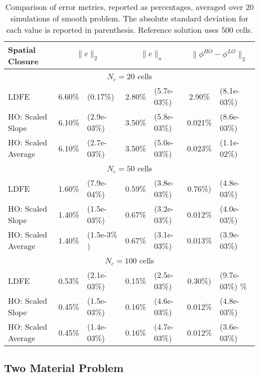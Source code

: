 \begin{table}[H]
    \caption{\label{tab:smooth} Comparison of error metrics, reported as percentages, averaged over 20 simulations of smooth problem.  The absolute
standard deviation for each value is reported in parenthesis. Reference solution uses 500 cells.}
    \begin{tabular}{|l|cl|cl|cl|} \hline
        Spatial Closure & \multicolumn{2}{|c|}{$\|e\|_2$}  & \multicolumn{2}{|c|}{$\|e\|_{a}$} & \multicolumn{2}{|c|}{$\|\phi^{HO}
        -\phi^{LO}\|_{2}$} \\  \hline \hline
        \multicolumn{7}{|c|}{$N_c = 20$ cells} \\ \hline
LDFE               &   6.60\%  &   (0.17\%)  &   2.80\%     &   (5.7e-03\%)  &   2.90\%   &  (8.1e-03\%)  \\
HO: Scaled Slope   &   6.10\%  &   (2.9e-03\%)  &   3.50\%  &   (5.8e-03\%)  &   0.021\%  &  (8.6e-03\%)  \\
HO: Scaled Average &   6.10\%  &   (2.7e-03\%)  &   3.50\%  &   (5.0e-03\%)  &   0.023\%  &  (1.1e-02\%)  \\ \hline
       \multicolumn{7}{|c|}{$N_c  = 50$ cells}   \\ \hline
LDFE               &   1.60\%  &   (7.9e-04\%)  &   0.59\%  &   (3.8e-03\%)  &   0.76\%)  &  (4.8e-03\%)  \\
HO: Scaled Slope   &   1.40\%  &   (1.5e-03\%)  &   0.67\%  &   (3.2e-03\%)  &   0.012\%  &  (4.0e-03\%)  \\
HO: Scaled Average &   1.40\%  &   (1.5e-3\% ) &   0.67\%   &   (3.1e-03\%)  &   0.013\%  &  (3.9e-03\%)  \\ \hline
       \multicolumn{7}{|c|}{$N_c  = 100$ cells}   \\ \hline
LDFE               &   0.53\%  &   (2.1e-03\%)  &   0.15\%  &   (2.5e-03\%)  &   0.30\%)  &  (9.7e-03\%)  \%\\
HO: Scaled Slope   &   0.45\%  &   (1.5e-03\%)  &   0.16\%  &   (4.6e-03\%)  &   0.012\%  &  (4.8e-03\%)  \\
HO: Scaled Average &   0.45\%  &   (1.4e-03\%)  &   0.16\%  &   (4.7e-03\%)  &   0.012\%  &  (3.6e-03\%)  \\ \hline
    \end{tabular}
\end{table}



\subsection{Two Material Problem}

